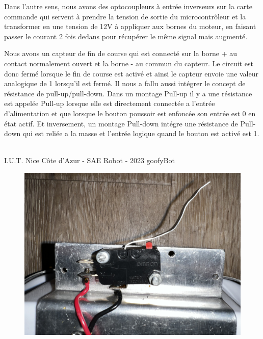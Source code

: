 Dans l’autre sens, nous avons des optocoupleurs à entrée inverseurs sur la carte commande qui servent à prendre la tension de sortie du microcontrôleur et la transformer en une tension de 12V à appliquer aux bornes du moteur, en faisant passer le courant 2 fois dedans pour récupérer le même signal mais augmenté.

Nous avons un capteur de fin de course qui est connecté sur la borne + au contact normalement ouvert et la borne - au commun du capteur. Le circuit est donc fermé lorsque le fin de course est activé et ainsi le capteur envoie une valeur analogique de 1 lorsqu'il est fermé.
Il nous a fallu aussi intégrer le concept de résistance de pull-up/pull-down. Dans un montage Pull-up il y a une résistance est appelée Pull-up lorsque elle est directement connectée a l'entrée d'alimentation et que lorsque le bouton poussoir est enfoncée son entrée est 0 en état actif. Et inversement, un montage Pull-down intégre une résistance de Pull-down qui est reliée a la masse et l'entrée logique quand le bouton est activé est 1.       

\vfill
\noindent\makebox[\linewidth]{\rule{.8\paperwidth}{.6pt}}\\[0.2cm]
I.U.T. Nice Côte d'Azur - SAE Robot - 2023 \hfill goofyBot
\noindent\makebox[\linewidth]{\rule{.8\paperwidth}{.6pt}}
\newpage

\begin{figure}[H]
\centering
\begin{minipage}{.5\textwidth}
  \centering
  \centerline{\includegraphics[width=1\linewidth]{img/cartes/tor.jpeg}}
  \label{fig:tor}
\end{minipage}%
\end{figure}

